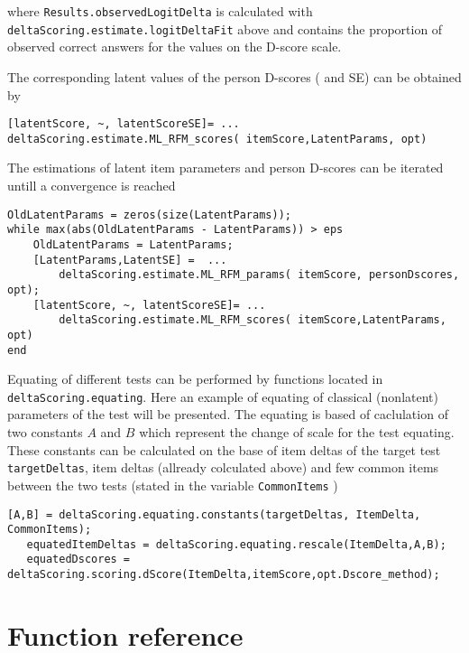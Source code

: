 \documentclass[12pt]{article}
\begin{document}
where {\tt Results.observedLogitDelta} is calculated with \\{\tt deltaScoring.estimate.logitDeltaFit} above and contains the proportion of observed correct answers for the values on the D-score scale.

The corresponding latent values of the person D-scores ( and SE) can be obtained by
\begin{lstlisting}[style=Matlab-bw]
[latentScore, ~, latentScoreSE]= ...
deltaScoring.estimate.ML_RFM_scores( itemScore,LatentParams, opt)
\end{lstlisting}

The estimations of latent item parameters and person D-scores can be iterated untill a convergence is reached

\begin{lstlisting}[style=Matlab-bw]
OldLatentParams = zeros(size(LatentParams));
while max(abs(OldLatentParams - LatentParams)) > eps
	OldLatentParams = LatentParams;
	[LatentParams,LatentSE] =  ...
		deltaScoring.estimate.ML_RFM_params( itemScore, personDscores, opt);
	[latentScore, ~, latentScoreSE]= ...
		deltaScoring.estimate.ML_RFM_scores( itemScore,LatentParams, opt)
end
\end{lstlisting}

Equating of different tests can be performed by functions located in {\tt deltaScoring.equating}. Here an example of equating of classical (nonlatent) parameters of the test will be presented. The equating is based of caclulation of two constants $A$ and $B$ which represent the change of scale for the test equating. These constants can be calculated on the base of  item deltas of the target test {\tt  targetDeltas}, item deltas (allready colculated above) and few common items between the two tests (stated in the variable {\tt CommonItems} )

\begin{lstlisting}[style=Matlab-bw]
   [A,B] = deltaScoring.equating.constants(targetDeltas, ItemDelta, CommonItems);
   equatedItemDeltas = deltaScoring.equating.rescale(ItemDelta,A,B);
   equatedDscores = deltaScoring.scoring.dScore(ItemDelta,itemScore,opt.Dscore_method);
\end{lstlisting}


\section{Function reference}


\end{document}
